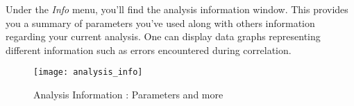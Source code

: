 \indent\indent Under the \textit{Info} menu, you'll find the analysis information window. This provides you a summary of parameters you've used along with others information regarding your current analysis. One can display data graphs representing different information such as errors encountered during correlation.

\begin{figure}[!h]
   \centering
   \texttt{[image: analysis\_info]}
   \caption{Analysis Information : Parameters and more}
\end{figure}
